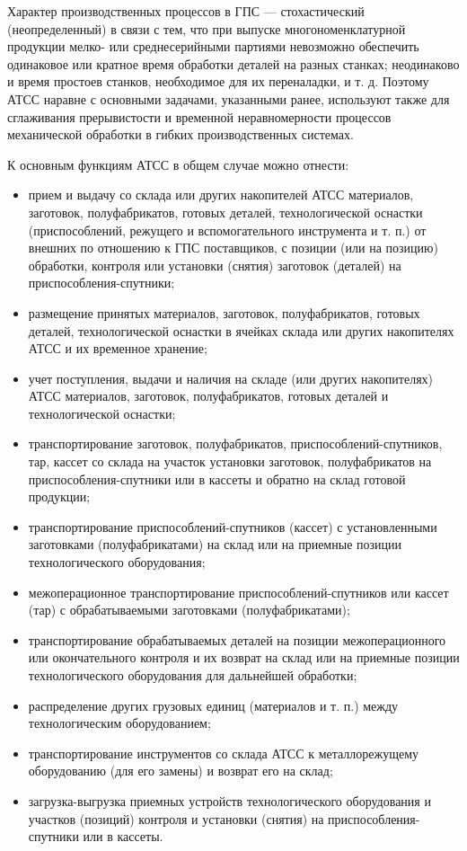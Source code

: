 Характер производственных процессов в ГПС --- стохастический (неопределенный) в связи с тем, что при выпуске многономенклатурной продукции мелко- или среднесерийными партиями невозможно обеспечить одинаковое или кратное время обработки деталей на разных станках; неодинаково и время простоев станков, необходимое для их переналадки, и т. д. Поэтому АТСС наравне с основными задачами, указанными ранее, используют также для сглаживания прерывистости и временной неравномерности процессов механической обработки в гибких производственных системах.

К основным функциям АТСС в общем случае можно отнести:

\begin{itemize}
    \item прием и выдачу со склада или других накопителей АТСС материалов, заготовок, полуфабрикатов, готовых деталей, технологической оснастки (приспособлений, режущего и вспомогательного инструмента и т. п.) от внешних по отношению к ГПС поставщиков, с позиции (или на позицию) обработки, контроля или установки (снятия) заготовок (деталей) на приспособления-спутники; 
    \item размещение принятых материалов, заготовок, полуфабрикатов, готовых деталей, технологической оснастки в ячейках склада или других накопителях АТСС и их временное хранение; 
    \item учет поступления, выдачи и наличия на складе (или других накопителях) АТСС материалов, заготовок, полуфабрикатов, готовых деталей и технологической оснастки;
    \item транспортирование заготовок, полуфабрикатов, приспособлений-спутников, тар, кассет со склада на участок установки заготовок, полуфабрикатов на приспособления-спутники или в кассеты и обратно на склад готовой продукции;
    \item транспортирование приспособлений-спутников (кассет) с установленными заготовками (полуфабрикатами) на склад или на приемные позиции технологического оборудования;
    \item межоперационное транспортирование приспособлений-спутников или кассет (тар) с обрабатываемыми заготовками (полуфабрикатами);
    \item транспортирование обрабатываемых деталей на позиции межоперационного или окончательного контроля и их возврат на склад или на приемные позиции технологического оборудования для дальнейшей обработки;
    \item распределение других грузовых единиц (материалов и т. п.) между технологическим оборудованием;
    \item транспортирование инструментов со склада АТСС к металлорежущему оборудованию (для его замены) и возврат его на склад;
    \item загрузка-выгрузка приемных устройств технологического оборудования и участков (позиций) контроля и установки (снятия) на приспособления-спутники или в кассеты.
\end{itemize}

